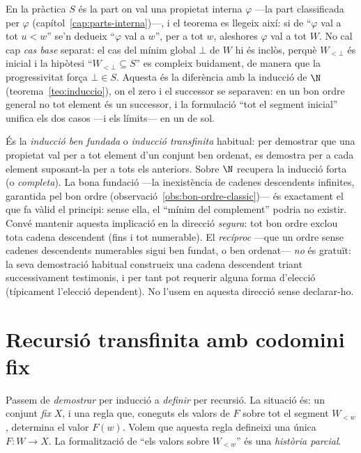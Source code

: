 \begin{observacio}\label{obs:induccio-propietats}
En la pràctica \(S\) és la part on val una propietat interna
\(\varphi\) ---la part classificada per \(\varphi\)
(capítol~\ref{cap:parts-interna})---, i el teorema es llegeix així: si de
\enquote{\(\varphi\) val a tot \(u<w\)} se'n dedueix \enquote{\(\varphi\) val
a \(w\)}, per a tot \(w\), aleshores \(\varphi\) val a tot \(W\). No cal cap
\emph{cas base} separat: el cas del mínim global \(\bot\) de \(W\) hi és
inclòs, perquè \(W_{<\bot}\) és inicial i la hipòtesi
\enquote{\(W_{<\bot}\subseteq S\)} es compleix buidament, de manera que la
progressivitat força \(\bot\in S\). Aquesta és la diferència amb la inducció
de \(\N\) (teorema~\ref{teo:induccio}), on el zero i el successor se separaven:
en un bon ordre general no tot element és un successor, i la formulació
\enquote{tot el segment inicial} unifica els dos casos ---i els límits--- en
un de sol.
\end{observacio}

\begin{observacio}\label{obs:induccio-transf-classica}
És la \emph{inducció ben fundada} o \emph{inducció transfinita} habitual: per
demostrar que una propietat val per a tot element d'un conjunt ben ordenat,
es demostra per a cada element suposant-la per a tots els anteriors. Sobre
\(\N\) recupera la inducció forta (o \emph{completa}). La bona fundació ---la
inexistència de cadenes descendents infinites, garantida pel bon ordre
(observació~\ref{obs:bon-ordre-classic})--- és exactament el que fa vàlid el
principi: sense ella, el \enquote{mínim del complement} podria no existir.
Convé mantenir aquesta implicació en la direcció \emph{segura}: tot bon ordre
exclou tota cadena descendent (fins i tot numerable). El \emph{recíproc}
---que un ordre sense cadenes descendents numerables sigui ben fundat, o ben
ordenat--- \emph{no} és gratuït: la seva demostració habitual construeix una
cadena descendent triant successivament testimonis, i per tant pot requerir
alguna forma d'elecció (típicament l'elecció dependent). No l'usem en aquesta
direcció sense declarar-ho.
\end{observacio}

\section{Recursió transfinita amb codomini fix}\label{sec:recursio-fix}

Passem de \emph{demostrar} per inducció a \emph{definir} per recursió. La
situació és: un conjunt \emph{fix} \(X\), i una regla que, coneguts els valors
de \(F\) sobre tot el segment \(W_{<w}\), determina el valor \(F(w)\). Volem
que aquesta regla defineixi una única \(F\colon W\to X\). La formalització de
\enquote{els valors sobre \(W_{<w}\)} és una \emph{història parcial}.

